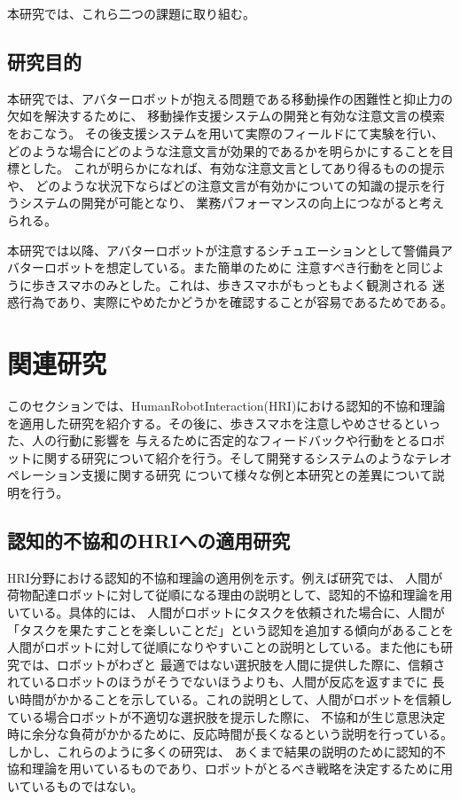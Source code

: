 \documentclass{kuisthesis}
\begin{document}
本研究では、これら二つの課題に取り組む。


\section{研究目的}
\label{sec: 研究目的}
本研究では、アバターロボットが抱える問題である移動操作の困難性と抑止力の欠如を解決するために、
移動操作支援システムの開発と有効な注意文言の模索をおこなう。
その後支援システムを用いて実際のフィールドにて実験を行い、
どのような場合にどのような注意文言が効果的であるかを明らかにすることを目標とした。
これが明らかになれば、有効な注意文言としてあり得るものの提示や、
どのような状況下ならばどの注意文言が有効かについての知識の提示を行うシステムの開発が可能となり、
業務パフォーマンスの向上につながると考えられる。


本研究では以降、アバターロボットが注意するシチュエーションとして警備員アバターロボットを想定している。また簡単のために
注意すべき行動を\cite{Schneider2022,Mizumaru2019}と同じように歩きスマホのみとした。これは、歩きスマホがもっともよく観測される
迷惑行為であり、実際にやめたかどうかを確認することが容易であるためである。



\chapter{関連研究}
このセクションでは、HumanRobotInteraction(HRI)における認知的不協和理論を適用した研究を紹介する。その後に、歩きスマホを注意しやめさせるといった、人の行動に影響を
与えるために否定的なフィードバックや行動をとるロボットに関する研究について紹介を行う。そして開発するシステムのようなテレオペレーション支援に関する研究
について様々な例と本研究との差異について説明を行う。
\section{認知的不協和のHRIへの適用研究}
HRI分野における認知的不協和理論の適用例を示す。例えば研究\cite{washburn2022exploring}では、
人間が荷物配達ロボットに対して従順になる理由の説明として、認知的不協和理論を用いている。具体的には、
人間がロボットにタスクを依頼された場合に、人間が「タスクを果たすことを楽しいことだ」という認知を追加する傾向があることを
人間がロボットに対して従順になりやすいことの説明としている。また他にも研究\cite{herse2018you}では、ロボットがわざと
最適ではない選択肢を人間に提供した際に、信頼されているロボットのほうがそうでないほうよりも、人間が反応を返すまでに
長い時間がかかることを示している。これの説明として、人間がロボットを信頼している場合ロボットが不適切な選択肢を提示した際に、
不協和が生じ意思決定時に余分な負荷がかかるために、反応時間が長くなるという説明を行っている。しかし、これらのように多くの研究は、
あくまで結果の説明のために認知的不協和理論を用いているものであり、ロボットがとるべき戦略を決定するために用いているものではない。
\end{document}
